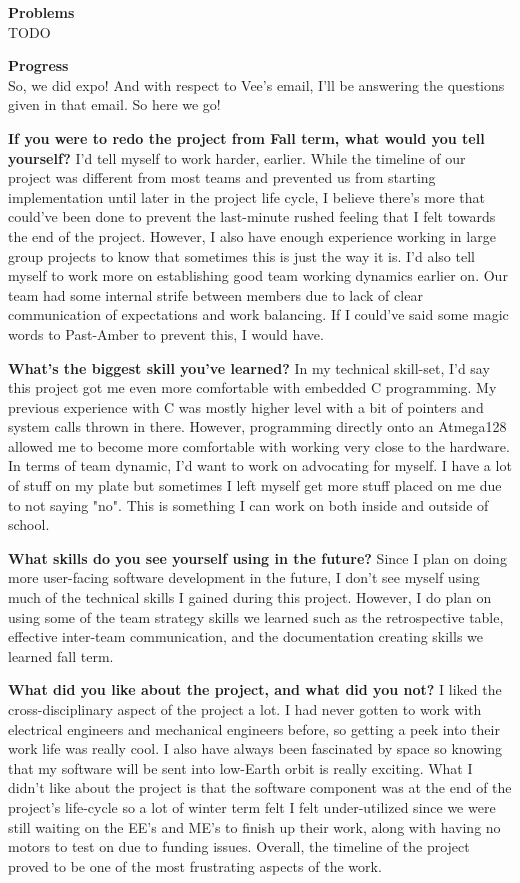 \textbf{Problems} \\ 
TODO

\textbf{Progress} \\
So, we did expo! And with respect to Vee's email, I'll be answering the questions given in that email. So here we go!

\textbf{If you were to redo the project from Fall term, what would you tell yourself?}
I'd tell myself to work harder, earlier. While the timeline of our project was different from most teams and prevented us from starting implementation 
until later in the project life cycle, I believe there's more that could've been done to prevent the last-minute rushed feeling that I felt towards the 
end of the project. However, I also have enough experience working in large group projects to know that sometimes this is just the way it is. I'd also 
tell myself to work more on establishing good team working dynamics earlier on. Our team had some internal strife between members due to lack of clear 
communication of expectations and work balancing. If I could've said some magic words to Past-Amber to prevent this, I would have.

\textbf{What's the biggest skill you've learned?}
In my technical skill-set, I'd say this project got me even more comfortable with embedded C programming. My previous experience with C was mostly higher 
level with a bit of pointers and system calls thrown in there. However, programming directly onto an Atmega128 allowed me to become more comfortable with 
working very close to the hardware. In terms of team dynamic, I'd want to work on advocating for myself. I have a lot of stuff on my plate but sometimes 
I left myself get more stuff placed on me due to not saying "no". This is something I can work on both inside and outside of school.

\textbf{What skills do you see yourself using in the future?}
Since I plan on doing more user-facing software development in the future, I don't see myself using much of the technical skills I gained during this 
project. However, I do plan on using some of the team strategy skills we learned such as the retrospective table, effective inter-team communication, and 
the documentation creating skills we learned fall term.

\textbf{What did you like about the project, and what did you not?}
I liked the cross-disciplinary aspect of the project a lot. I had never gotten to work with electrical engineers and mechanical engineers before, so 
getting a peek into their work life was really cool. I also have always been fascinated by space so knowing that my software will be sent into low-Earth 
orbit is really exciting. What I didn't like about the project is that the software component was at the end of the project's life-cycle so a lot of 
winter term felt I felt under-utilized since we were still waiting on the EE's and ME's to finish up their work, along with having no motors to test on 
due to funding issues. Overall, the timeline of the project proved to be one of the most frustrating aspects of the work.

